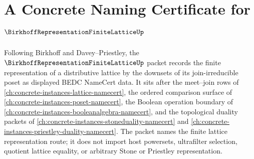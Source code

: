 \chapter{A Concrete Naming Certificate for $\BirkhoffRepresentationFiniteLatticeUp$}
\label{ch:concrete-instances-birkhoff-representation-finite-lattice-namecert}

Following Birkhoff and Davey--Priestley, the $\BirkhoffRepresentationFiniteLatticeUp$ packet records the finite representation of a distributive lattice by the downsets of its join-irreducible poset as displayed BEDC NameCert data. It sits after the meet--join rows of \autoref{ch:concrete-instances-lattice-namecert}, the ordered comparison surface of \autoref{ch:concrete-instances-poset-namecert}, the Boolean operation boundary of \autoref{ch:concrete-instances-booleanalgebra-namecert}, and the topological duality packets of \autoref{ch:concrete-instances-stoneduality-namecert} and \autoref{ch:concrete-instances-priestley-duality-namecert}. The packet names the finite lattice representation route; it does not import host powersets, ultrafilter selection, quotient lattice equality, or arbitrary Stone or Priestley representation.

